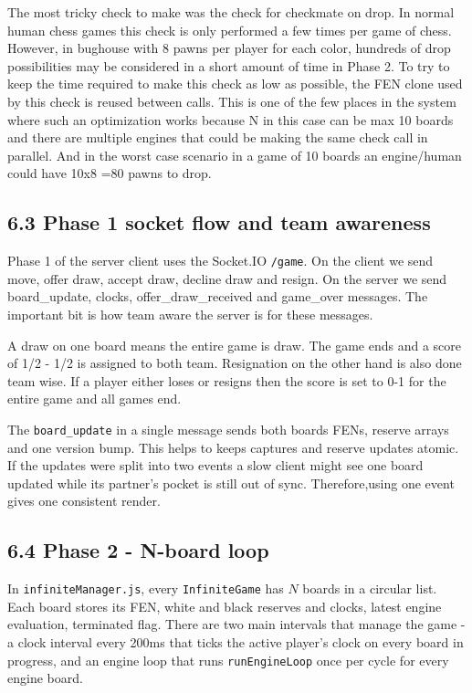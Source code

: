 \documentclass[11pt,a4paper]{article}
\begin{document}
The most tricky check to make was the check for checkmate on drop. In normal human chess games this check is only performed a few times per game of chess. However, in bughouse with 8 pawns per player for each color, hundreds of drop possibilities may be considered in a short amount of time in Phase 2. To try to keep the time required to make this check as low as possible, the FEN clone used by this check is reused between calls. This is one of the few places in the system where such an optimization works because N in this case can be max 10 boards and there are multiple engines that could be making the same check call in parallel. And in the worst case scenario in a game of 10 boards an engine/human could have 10x8 =80 pawns to drop.

\subsection*{6.3 Phase 1 socket flow and team awareness}
Phase 1 of the server client uses the Socket.IO \texttt{/game}. On the client we send move, offer draw, accept draw, decline draw and resign. On the server we send board\_update, clocks, offer\_draw\_received and game\_over messages. The important bit is how team aware the server is for these messages.

A draw on one board means the entire game is draw. The game ends and a score of 1/2 - 1/2 is assigned to both team.
Resignation on the other hand is also done team wise. If a player either loses or resigns then the score is set to 0-1 for the entire game and all games end.

The \texttt{board\_update} in a single message sends both boards FENs, reserve arrays and one version bump. This helps to keeps captures and reserve updates atomic. If the updates were split into two events a slow client might see one board updated while its partner’s pocket is still out of sync. Therefore,using one event gives one consistent render.

\subsection*{6.4 Phase 2 - N-board loop}

In \texttt{infiniteManager.js}, every \texttt{InfiniteGame} has $N$ boards in a circular list. Each board stores its FEN, white and black reserves and clocks, latest engine evaluation, terminated flag. There are two main intervals that manage the game - a clock interval every 200ms that ticks the active player's clock on every board in progress, and an engine loop that runs \texttt{runEngineLoop} once per cycle for every engine board.
\end{document}
